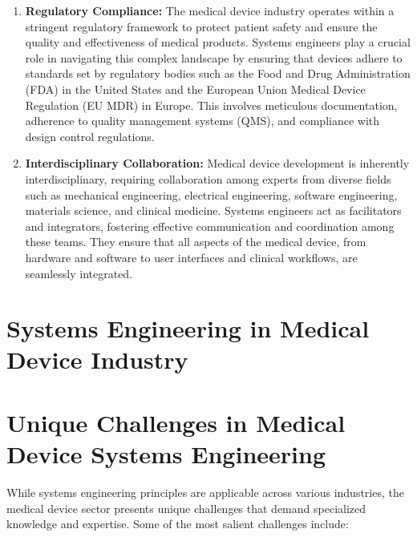 \documentclass[conference]{IEEEtran}
\begin{document}
\begin{enumerate}
        \item \textbf{Regulatory Compliance:} The medical device industry 
        operates within a stringent regulatory framework to protect patient 
        safety and ensure the quality and effectiveness of medical products. 
        Systems engineers play a crucial role in navigating this complex 
        landscape by ensuring that devices adhere to standards set by 
        regulatory bodies such as the Food and Drug Administration (FDA) 
        in the United States and the European Union Medical Device 
        Regulation (EU MDR) in Europe. This involves meticulous 
        documentation, adherence to quality management systems (QMS), 
        and compliance with design control regulations.

        \item \textbf{Interdisciplinary Collaboration:} Medical device 
        development is inherently interdisciplinary, requiring 
        collaboration among experts from diverse fields such as 
        mechanical engineering, electrical engineering, software 
        engineering, materials science, and clinical medicine. Systems 
        engineers act as facilitators and integrators, fostering 
        effective communication and coordination among these teams. 
        They ensure that all aspects of the medical device, from hardware 
        and software to user interfaces and clinical workflows, are 
        seamlessly integrated.
    \end{enumerate}

\section{Systems Engineering in Medical Device Industry}

\section{Unique Challenges in Medical Device Systems Engineering}

    While systems engineering principles are applicable across various 
    industries, the medical device sector presents unique challenges that 
    demand specialized knowledge and expertise. Some of the most salient 
    challenges include:
\end{document}
